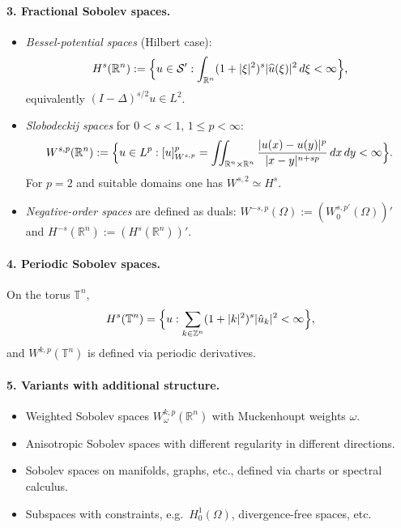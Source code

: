 \documentclass[12pt,a4paper]{article}
\theoremstyle{plain}
\theoremstyle{definition}
\theoremstyle{remark}
\theoremstyle{remark}
\begin{document}
\paragraph{3. Fractional Sobolev spaces.}
\begin{itemize}
	\item[(a)] \emph{Bessel-potential spaces} (Hilbert case):
	\[
	H^s(\mathbb R^n)
	:= \Bigl\{u\in\mathcal S' : \int_{\mathbb R^n}(1+|\xi|^2)^s|\widehat u(\xi)|^2\,d\xi<\infty\Bigr\},
	\]
	equivalently $(I-\Delta)^{s/2}u\in L^2$.
	\item[(b)] \emph{Slobodeckij spaces} for $0<s<1$, $1\le p<\infty$:
	\[
	W^{s,p}(\mathbb R^n)
	:= \Bigl\{u\in L^p : [u]_{W^{s,p}}^p
	= \iint_{\mathbb R^n\times\mathbb R^n}\frac{|u(x)-u(y)|^p}{|x-y|^{n+sp}}\,dx\,dy <\infty\Bigr\}.
	\]
	For $p=2$ and suitable domains one has $W^{s,2}\simeq H^s$.
	\item[(c)] \emph{Negative-order spaces} are defined as duals:
	$W^{-s,p}(\Omega) := (W^{s,p'}_0(\Omega))'$ and $H^{-s}(\mathbb R^n):=(H^s(\mathbb R^n))'$.
\end{itemize}

\medskip

\paragraph{4. Periodic Sobolev spaces.}
On the torus $\mathbb T^n$,
\[
H^s(\mathbb T^n) = \Bigl\{u:\sum_{k\in\mathbb Z^n}(1+|k|^2)^s|\hat u_k|^2<\infty\Bigr\},
\]
and $W^{k,p}(\mathbb T^n)$ is defined via periodic derivatives.

\medskip

\paragraph{5. Variants with additional structure.}
\begin{itemize}
	\item Weighted Sobolev spaces $W^{k,p}_\omega(\mathbb R^n)$ with Muckenhoupt weights $\omega$.
	\item Anisotropic Sobolev spaces with different regularity in different directions.
	\item Sobolev spaces on manifolds, graphs, etc., defined via charts or spectral calculus.
	\item Subspaces with constraints, e.g.\ $H^1_0(\Omega)$, divergence-free spaces, etc.
\end{itemize}

\medskip
\end{document}
